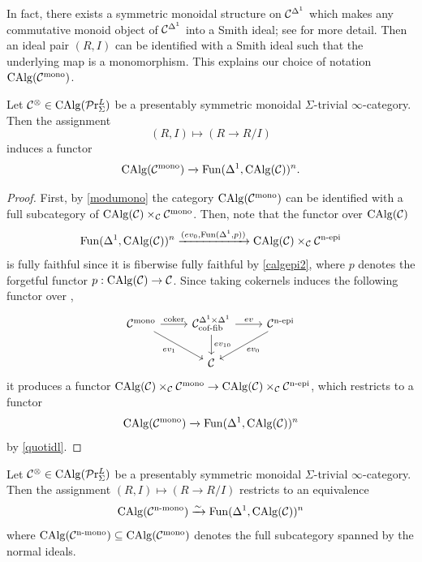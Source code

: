\documentclass[10pt,a4paper,oneside]{article}
\begin{document}
\begin{rem}
In fact, there exists a symmetric monoidal structure on $\mathcal{C}^{\Delta^1}$ which makes any commutative monoid object of $\mathcal{C}^{\Delta^1}$ into a Smith ideal; see \cite[Section~3.1]{mao2021revisiting} for more detail. Then an ideal pair $(R,I)$ can be identified with a Smith ideal such that the underlying map is a monomorphism. This explains our choice of notation $\operatorname{CAlg}(\mathcal{C}^{\operatorname{mono}})$.
\end{rem}

\begin{prop}
Let $\mathcal{C}^\otimes\in\operatorname{CAlg}(\mathcal{P}\mathrm{r}^L_\Sigma)$ be a presentably symmetric monoidal $\Sigma$-trivial $\infty$-category. Then  the assignment $$(R,I)\mapsto (R\to R/I)$$ induces a functor $$\operatorname{CAlg}(\mathcal{C}^{\operatorname{mono}})\xrightarrow{}\operatorname{Fun}(\Delta^1,\operatorname{CAlg}(\mathcal{C}))^n.$$
\end{prop}

\begin{proof}
First, by \cref{modumono} the category $\operatorname{CAlg}(\mathcal{C}^{\operatorname{mono}})$ can be identified with a full subcategory of $\operatorname{CAlg}(\mathcal{C})\times_{\mathcal{C}}\mathcal{C}^{\operatorname{mono}}$. Then, note that the functor over $\operatorname{CAlg}(\mathcal{C})$ $$\operatorname{Fun}(\Delta^1,\operatorname{CAlg}(\mathcal{C}))^n\xrightarrow{(ev_0, \operatorname{Fun}(\Delta^1,p))} \operatorname{CAlg}(\mathcal{C})\times_{\mathcal{C}} \mathcal{C}^{\operatorname{n-epi}}$$ is fully faithful since it is fiberwise fully faithful by \cref{calgepi2}, where $p$ denotes the forgetful functor $p:\operatorname{CAlg}(\mathcal{C})\to\mathcal{C}$. Since taking cokernels induces the following functor over \mcc,
$$
\begin{tikzcd}
\mcc^{\op{mono}} \arrow[rd, "ev_1"'] \arrow[r, "\coker"] & \mcc^{\Delta^1\times\Delta^1}_{\op{cof-fib}} \arrow[r, "ev"] \arrow[d, "ev_{10}"] & \mcc^{\op{n-epi}} \arrow[ld, "ev_0"] \\
& \mcc                                                                              &                                   
\end{tikzcd}
$$
it produces a functor $\operatorname{CAlg}(\mathcal{C})\times_{\mathcal{C}}\mathcal{C}^{\operatorname{mono}}\to \operatorname{CAlg}(\mathcal{C})\times_{\mathcal{C}} \mathcal{C}^{\operatorname{n-epi}}$, which restricts to a functor
$$\operatorname{CAlg}(\mathcal{C}^{\operatorname{mono}})\xrightarrow{}\operatorname{Fun}(\Delta^1,\operatorname{CAlg}(\mathcal{C}))^n$$  by \cref{quotidl}.
\end{proof}

\begin{thm}\label{thm:parametrized-ideal-epi}
Let $\mathcal{C}^\otimes\in\operatorname{CAlg}(\mathcal{P}\mathrm{r}^L_{\Sigma})$ be a presentably symmetric monoidal $\Sigma$-trivial $\infty$-category. Then the assignment $(R,I)\mapsto (R\to R/I)$ restricts to an equivalence $$\operatorname{CAlg}(\mathcal{C}^{\operatorname{n-mono}})\xrightarrow{\sim}\operatorname{Fun}(\Delta^1,\operatorname{CAlg}(\mathcal{C}))^n$$ where $\operatorname{CAlg}(\mathcal{C}^{\operatorname{n-mono}})\subseteq \operatorname{CAlg}(\mathcal{C}^{\operatorname{mono}})$ denotes the full subcategory spanned by the normal ideals.
\end{thm}
\end{document}
